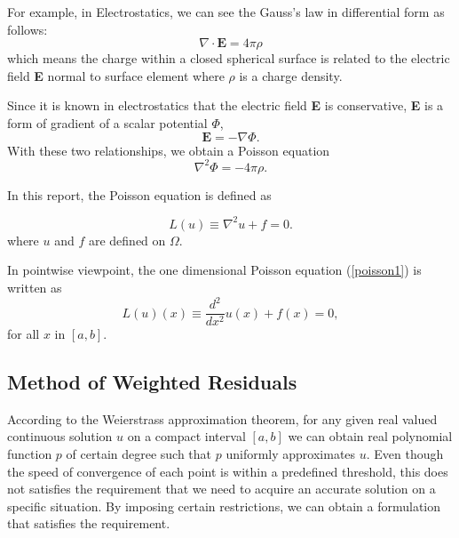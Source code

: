 For example, in Electrostatics, we can see the Gauss's law in differential form as follows\cite{Johnson}:
\begin{equation}
\nabla \cdot \mathbf{E} = 4 \pi \rho
\end{equation}
which means the charge within a closed spherical surface is related to the electric field \textbf{E} normal to surface element where $\rho$ is a charge density.

Since it is known in electrostatics that the electric field \textbf{E} is conservative, \textbf{E} is a form of gradient of a scalar potential $\Phi$,
\begin{equation}
\mathbf{E} = - \nabla\Phi.
\end{equation}
With these two relationships, we obtain a Poisson equation
\begin{equation}
\nabla^2\Phi = -4\pi\rho.
\end{equation}

In this report, the Poisson equation is defined as

\begin{equation}
\label{poisson1}
L(u) \equiv  \nabla^2 u + f = 0.
\end{equation}
where $u$ and $f$ are defined on $\Omega$.

In pointwise viewpoint, the one dimensional Poisson equation
(\ref{poisson1}) is written as
\begin{equation}
\label{poisson2}
L(u)(x) \equiv \frac{d^2}{dx^2} u(x) + f(x) = 0,
\end{equation}
for all $x$ in $[a, b]$.

\subsection{Method of Weighted Residuals}
According to the Weierstrass approximation theorem, for any given real valued continuous solution $u$ on a compact interval $[a, b]$ we can obtain real polynomial function $p$ of certain degree such that $p$ uniformly approximates $u$. Even though the speed of convergence of each point is within a predefined threshold, this does not satisfies the requirement that we need to acquire an accurate solution on a specific situation. By imposing certain restrictions, we can obtain a formulation that satisfies the requirement.

